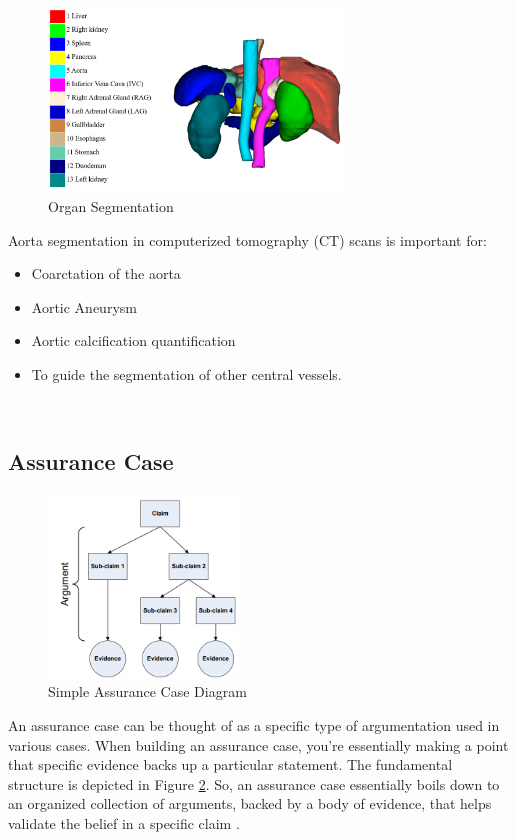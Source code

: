\begin{figure}[ht]
    \centering
    \includegraphics[width=0.7\textwidth]{figures/Intro/segmentation.png}
    \caption[Organ Segmentation]{Organ Segmentation \cite{Ma-2021-AbdomenCT-1K}}
    \label{fig_seg}
\end{figure}

Aorta segmentation in computerized tomography (CT) scans is important for:
\begin{itemize}
\item Coarctation of the aorta
\item Aortic Aneurysm
\item Aortic calcification quantification
\item To guide the segmentation of other central vessels. 
\end{itemize} ~

\subsection{Assurance Case}
\begin{figure}[ht]
    \centering
    \includegraphics[width=0.45\textwidth]{figures/Intro/ac_diagram.png}
    \caption[Simple Assurance Case Diagram]{Simple Assurance Case Diagram \cite{doi:10.2514/6.2009-1921}}
    \label{fig_ac_diagram}
\end{figure}

An assurance case can be thought of as a specific type of argumentation used in various cases. When building an assurance case, you're essentially making a point that specific evidence backs up a particular statement. The fundamental structure is depicted in Figure \ref{fig_ac_diagram}. So, an assurance case essentially boils down to an organized collection of arguments, backed by a body of evidence, that helps validate the belief in a specific claim \cite{doi:10.2514/6.2009-1921}.


